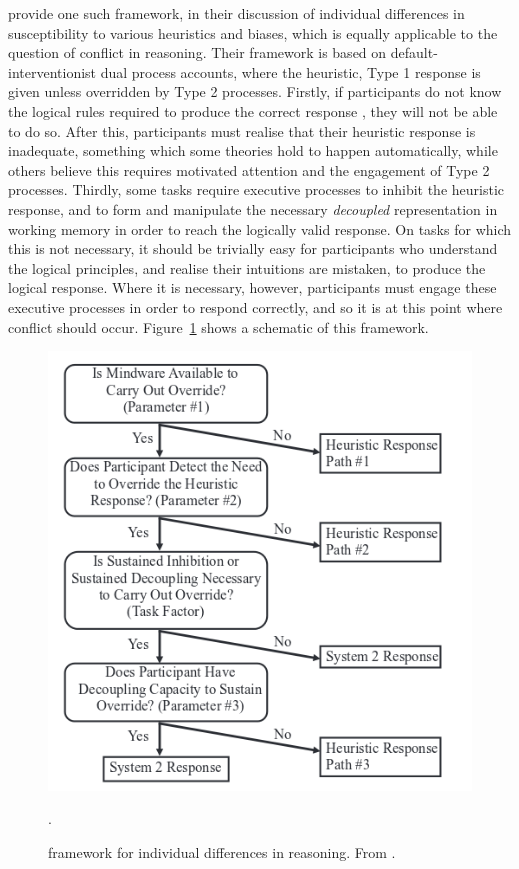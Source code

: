 \citet{Stanovich2008} provide one such framework,
in their discussion of individual differences
in susceptibility to various heuristics and biases,
which is equally applicable to the question of conflict in reasoning.
Their framework is based on default-interventionist dual process accounts,
where the heuristic, Type 1 response is given
unless overridden by Type 2 processes.
Firstly, if participants do not know
the logical rules required to produce the correct response
\citep[the \emph{Mindware}, in the terms of ][]{Stanovich2008},
they will not be able to do so.
After this, participants must realise that
their heuristic response is inadequate,
something which some theories \citep{DeNeys2012} hold to happen automatically,
while others \citep{Evans2006,Evans2013a,Kahneman2011} believe
this requires motivated attention
and the engagement of Type 2 processes.
Thirdly, some tasks require executive processes
to inhibit the heuristic response,
and to form and manipulate the necessary
\emph{decoupled} representation in working memory
in order to reach the logically valid response.
On tasks for which this is not necessary,
it should be trivially easy for participants who
understand the logical principles, and realise their intuitions are mistaken,
to produce the logical response.
Where it is necessary, however, participants must
engage these executive processes in order to respond correctly,
and so it is at this point where conflict should occur.
Figure~\ref{fig:stanovich} shows a schematic of this framework.

\begin{figure}[ht]
  \centering
  \includegraphics[width=.5\textwidth]{imgs/stanovich.png}
  \caption[The \citet{Stanovich2008} framework for individual differences in reasoning.]{
     framework for individual differences in reasoning.
    From .
  }.
  \label{fig:stanovich}
\end{figure}



